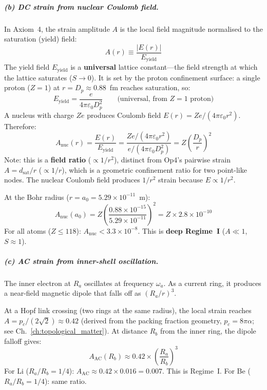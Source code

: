 \subparagraph{(b) DC strain from nuclear Coulomb field.}
In Axiom~4, the strain amplitude $A$ is the local field
magnitude normalised to the saturation (yield) field:
\begin{equation}
    A(r) \equiv \frac{|E(r)|}{E_{\text{yield}}}
    \label{eq:A_def}
\end{equation}
The yield field $E_{\text{yield}}$ is a \textbf{universal}
lattice constant---the field strength at which the lattice
saturates ($S \to 0$).  It is set by the proton confinement
surface: a single proton ($Z = 1$) at $r = D_p \approx 0.88$~fm
reaches saturation, so:
\begin{equation}
    E_{\text{yield}} = \frac{e}{4\pi\varepsilon_0 D_p^2}
    \qquad\text{(universal, from $Z = 1$ proton)}
\end{equation}
A nucleus with charge $Ze$ produces Coulomb field
$E(r) = Ze/(4\pi\varepsilon_0 r^2)$.  Therefore:
\begin{equation}
    A_{\text{nuc}}(r)
    = \frac{E(r)}{E_{\text{yield}}}
    = \frac{Ze/(4\pi\varepsilon_0 r^2)}{e/(4\pi\varepsilon_0 D_p^2)}
    = Z\!\left(\frac{D_p}{r}\right)^{\!2}
    \label{eq:A_nuclear}
\end{equation}
Note: this is a \textbf{field ratio} ($\propto 1/r^2$),
distinct from Op4's pairwise strain $A = d_{\text{sat}}/r$
($\propto 1/r$), which is a geometric confinement ratio
for two point-like nodes.  The nuclear Coulomb field produces
$1/r^2$ strain because $E \propto 1/r^2$.

At the Bohr radius ($r = a_0 = 5.29 \times 10^{-11}$~m):
\begin{equation}
    A_{\text{nuc}}(a_0)
    = Z\!\left(\frac{0.88\times 10^{-15}}
    {5.29\times 10^{-11}}\right)^{\!2}
    = Z \times 2.8 \times 10^{-10}
\end{equation}
For all atoms ($Z \leq 118$):
$A_{\text{nuc}} < 3.3 \times 10^{-8}$.
This is \textbf{deep Regime~I}
($A \ll 1$, $S \approx 1$).

\subparagraph{(c) AC strain from inner-shell oscillation.}
The inner electron at $R_a$ oscillates at frequency $\omega_a$.
As a current ring, it produces a near-field magnetic
dipole that falls off as $(R_a / r)^3$.

At a Hopf link crossing (two rings at the same radius),
the local strain reaches $A = p_c / (2\sqrt{2}) \approx 0.42$
(derived from the packing fraction geometry, $p_c = 8\pi\alpha$;
see Ch.~\ref{ch:topological_matter}).
At distance $R_b$ from the inner ring, the dipole falloff gives:
\begin{equation}
    A_{\text{AC}}(R_b) \approx 0.42
    \times \left(\frac{R_a}{R_b}\right)^{\!3}
    \label{eq:A_ac_dipole}
\end{equation}
For Li ($R_a/R_b = 1/4$):
$A_{\text{AC}} \approx 0.42 \times 0.016 = 0.007$.
This is Regime~I.  For Be ($R_a/R_b = 1/4$): same ratio.


